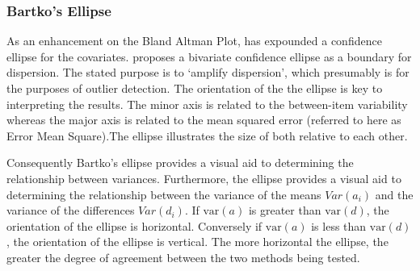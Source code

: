 \documentclass[12pt, a4paper]{report}
\begin{document}
	
	\newpage
	
	\subsubsection{Bartko's Ellipse}
	
	As an enhancement on the Bland Altman Plot, \citet{Bartko} has
	expounded a confidence ellipse for the covariates. \citet{Bartko} proposes
	a bivariate confidence ellipse as a boundary for dispersion. The stated purpose is to `amplify dispersion', which presumably is for  the purposes of outlier detection. The orientation of the the ellipse is key to interpreting the results. The minor axis is related to the between-item variability whereas the major axis is related to the mean squared error (referred to here as Error Mean Square).The ellipse illustrates the size of both relative to each
	other. 
	
	
	Consequently Bartko's ellipse provides a visual aid to determining the
	relationship between variances. 
	Furthermore, the ellipse provides a visual aid to determining the relationship
	between the variance of the means $Var(a_{i})$ and the variance of the differences $Var(d_{i})$. If $\mbox{var}(a)$ is greater than $\mbox{var}(d)$, the orientation of the ellipse is horizontal. Conversely if $\mbox{var}(a)$ is less than $\mbox{var}(d)$, the orientation of the ellipse is vertical. The more horizontal the ellipse, the greater the degree of agreement between the two methods being tested.
	
\end{document}
